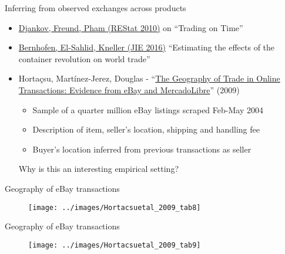 \documentclass[10pt,notes=hide]{beamer}
\begin{document}
\begin{frame}{Inferring from observed exchanges across products}
\begin{itemize}
	\item \href{https://www.mitpressjournals.org/doi/10.1162/rest.2009.11498}{Djankov, Freund, Pham (REStat 2010)} on ``Trading on Time''
	\item \href{https://www.sciencedirect.com/science/article/pii/S0022199615001403}{Bernhofen, El-Sahlid, Kneller (JIE 2016)} ``Estimating the effects of the container revolution on world trade''
	\item Horta\c{c}su, Mart\'{i}nez-Jerez, Douglas - ``\href{http://www.jstor.org.proxy.uchicago.edu/stable/25760347}{The Geography of Trade in Online Transactions: Evidence from eBay and MercadoLibre}'' (2009)
\begin{itemize}
	\item Sample of a quarter million eBay listings scraped Feb-May 2004
	\item Description of item, seller's location, shipping and handling fee
	\item Buyer's location inferred from previous transactions as seller
\end{itemize}
Why is this an interesting empirical setting?
\end{itemize}
\end{frame}
\begin{frame}{Geography of eBay transactions}
\begin{figure}
\texttt{[image: ../images/Hortacsuetal\_2009\_tab8]} \\
\end{figure}
\end{frame}
\begin{frame}{Geography of eBay transactions}
\begin{figure}
\texttt{[image: ../images/Hortacsuetal\_2009\_tab9]} \\
\end{figure}
\end{frame}
\end{document}
